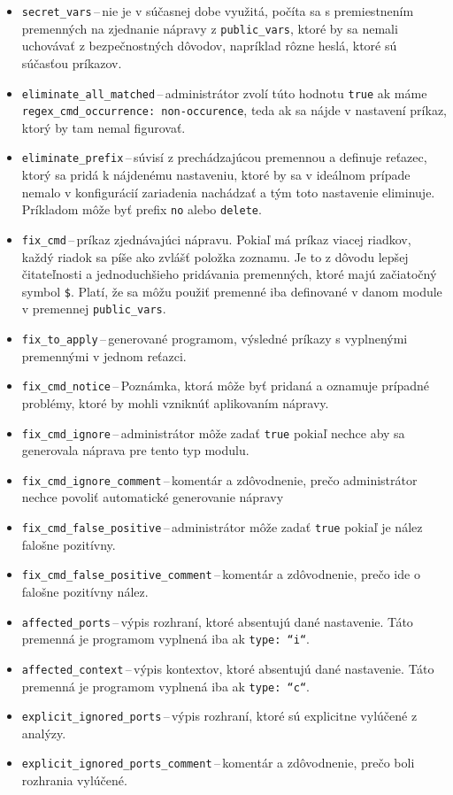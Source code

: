 \begin{itemize}
	\item \texttt{secret\_vars}\,--\,nie je v súčasnej dobe využitá, počíta sa s premiestnením premenných na zjednanie nápravy z \texttt{public\_vars}, ktoré by sa nemali uchovávať z bezpečnostných dôvodov, napríklad rôzne heslá, ktoré sú súčasťou príkazov.
	\item \texttt{eliminate\_all\_matched}\,--\,administrátor zvolí túto hodnotu \texttt{true} ak máme \texttt{regex\_cmd\_occurrence: non-occurence}, teda ak sa nájde v nastavení príkaz, ktorý by tam nemal figurovať.
	\item \texttt{eliminate\_prefix}\,--\,súvisí z prechádzajúcou premennou a definuje reťazec, ktorý sa pridá k nájdenému nastaveniu, ktoré by sa v ideálnom prípade nemalo v konfigurácií zariadenia nachádzať a tým toto nastavenie eliminuje. Príkladom môže byť prefix \texttt{no} alebo \texttt{delete}.
	\item \texttt{fix\_cmd}\,--\,príkaz zjednávajúci nápravu. Pokiaľ má príkaz viacej riadkov, každý riadok sa píše ako zvlášť položka zoznamu. Je to z dôvodu  lepšej čitateľnosti a jednoduchšieho pridávania premenných, ktoré majú začiatočný symbol \texttt{\$}. Platí, že sa môžu použiť premenné iba definované v danom module v premennej \texttt{public\_vars}.
	\item \texttt{fix\_to\_apply}\,--\,generované programom, výsledné príkazy s vyplnenými premennými v jednom reťazci.
	\item \texttt{fix\_cmd\_notice}\,--\,Poznámka, ktorá môže byť pridaná a oznamuje prípadné problémy, ktoré by mohli vzniknúť aplikovaním nápravy.
	\item \texttt{fix\_cmd\_ignore}\,--\,administrátor môže zadať \texttt{true} pokiaľ nechce aby sa generovala náprava pre tento typ modulu.
	\item \texttt{fix\_cmd\_ignore\_comment}\,--\,komentár a zdôvodnenie, prečo administrátor nechce povoliť automatické generovanie nápravy
	\item \texttt{fix\_cmd\_false\_positive}\,--\,administrátor môže zadať \texttt{true} pokiaľ je nález falošne pozitívny.
	\item \texttt{fix\_cmd\_false\_positive\_comment}\,--\,komentár a zdôvodnenie, prečo ide o falošne pozitívny nález.
	\item \texttt{affected\_ports}\,--\,výpis rozhraní, ktoré absentujú dané nastavenie. Táto premenná je programom vyplnená iba ak \texttt{type: ``i``}.
	\item \texttt{affected\_context}\,--\,výpis kontextov, ktoré absentujú dané nastavenie. Táto premenná je programom vyplnená iba ak \texttt{type: ``c``}.
	\item \texttt{explicit\_ignored\_ports}\,--\,výpis rozhraní, ktoré sú explicitne vylúčené z analýzy.
	\item \texttt{explicit\_ignored\_ports\_comment}\,--\,komentár a zdôvodnenie, prečo boli rozhrania vylúčené.
\end{itemize}
\vspace{1em}

